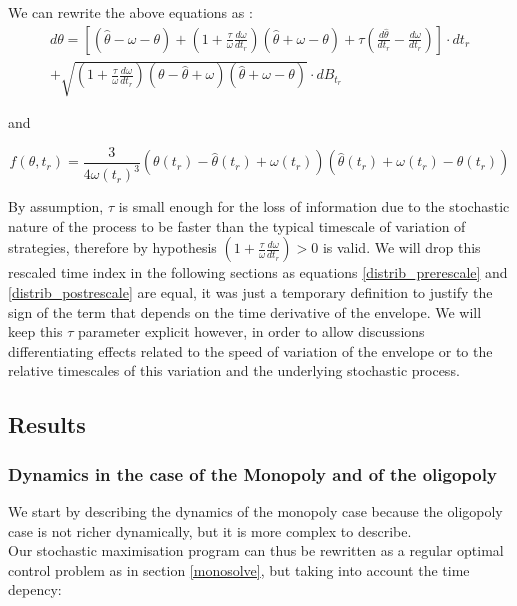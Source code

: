 We can rewrite the above equations as :
\begin{equation}
\begin{split}
  d\theta=\left[(\hat{\theta}-\omega-\theta)+\left(1+\frac{\tau}{\omega}\frac{d\omega}{dt_r}\right)(\hat{\theta}+\omega-\theta)+\tau\left(\frac{d\hat{\theta}}{dt_r}-\frac{d\omega}{dt_r}\right)\right]\cdot dt_r\\+\sqrt{\left(1+\frac{\tau}{\omega}\frac{d\omega}{dt_r}\right)(\theta-\hat{\theta}+\omega)(\hat{\theta}+\omega-\theta)}\cdot dB_{t_r}
\end{split}
\end{equation}

and 

\begin{equation}
f(\theta,t_r)=\frac{3}{4\omega(t_r)^3}(\theta(t_r)-\hat{\theta}(t_r)+\omega(t_r))(\hat{\theta}(t_r)+\omega(t_r)-\theta(t_r))
\label{distrib_postrescale}
\end{equation}

By assumption, $\tau$ is small enough for the loss of information due to the stochastic nature of the process to be faster than the typical timescale of variation of strategies, therefore by hypothesis $\left(1+\frac{\tau}{\omega}\frac{d\omega}{dt_r}\right)>0$ is valid. We will drop this rescaled time index in the following sections as equations \ref{distrib_prerescale} and \ref{distrib_postrescale} are equal, it was just a temporary definition to justify the sign of the term that depends on the time derivative of the envelope. We will keep this $\tau$ parameter explicit however, in order to allow discussions differentiating effects related to the speed of variation of the envelope or to the relative timescales of this variation and the underlying stochastic process.

\subsection{Results}
\subsubsection{Dynamics in the case of the Monopoly and of the oligopoly}
We start by describing the dynamics of the monopoly case because the oligopoly case is not richer dynamically, but it is more complex to describe. \\

Our stochastic maximisation program can thus be rewritten as a regular optimal control problem as in section \ref{monosolve}, but taking into account the time depency: 

